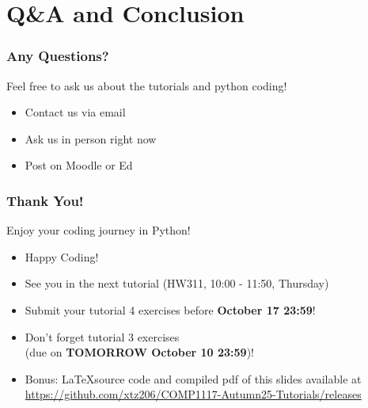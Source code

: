 \documentclass{beamer}
\begin{document}
\section{Q\&A and Conclusion}
\begin{frame}
    \frametitle{Any Questions?}

    Feel free to ask us about the tutorials and python coding!

    \begin{itemize}
        \item Contact us via email
        \item Ask us in person right now
        \item Post on Moodle or Ed
    \end{itemize}
\end{frame}

\begin{frame}
    \frametitle{Thank You!}

    Enjoy your coding journey in Python!

    \begin{itemize}
        \item Happy Coding!
        \item See you in the next tutorial (HW311, 10:00 - 11:50, Thursday)
        \item Submit your tutorial 4 exercises before \textbf{October 17 23:59}!
        \item Don't forget tutorial 3 exercises\\
              (due on \textbf{TOMORROW October 10 23:59})!
        \item Bonus: \LaTeX source code and compiled pdf of this slides available at
              \href{https://github.com/xtz206/COMP1117-Autumn25-Tutorials/releases}
              {https://github.com/xtz206/COMP1117-Autumn25-Tutorials/releases}
    \end{itemize}
\end{frame}
\end{document}
